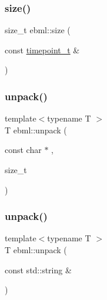\mbox{\label{namespaceebml_a95bc53481ddec59de86aa1ab7f8aae88}} 
\subsubsection{\texorpdfstring{size()}{size()}\hspace{0.1cm}{\footnotesize\ttfamily [6/6]}}
{\footnotesize\ttfamily size\+\_\+t ebml\+::size (\begin{DoxyParamCaption}\item[{const \mbox{\hyperlink{namespaceebml_a7e667ec3fe8b51fb5b8f9690734d8638}{timepoint\+\_\+t}} \&}]{ }\end{DoxyParamCaption})}

\mbox{\label{namespaceebml_a55a0f9d0c93e80d488021fd03c4f3861}} 
\subsubsection{\texorpdfstring{unpack()}{unpack()}\hspace{0.1cm}{\footnotesize\ttfamily [1/2]}}
{\footnotesize\ttfamily template$<$typename T $>$ \\
T ebml\+::unpack (\begin{DoxyParamCaption}\item[{const char $\ast$}]{,  }\item[{size\+\_\+t}]{ }\end{DoxyParamCaption})}

\mbox{\label{namespaceebml_a33d2b669314c64b95ed6c37534b6b655}} 
\subsubsection{\texorpdfstring{unpack()}{unpack()}\hspace{0.1cm}{\footnotesize\ttfamily [2/2]}}
{\footnotesize\ttfamily template$<$typename T $>$ \\
T ebml\+::unpack (\begin{DoxyParamCaption}\item[{const std\+::string \&}]{ }\end{DoxyParamCaption})}

